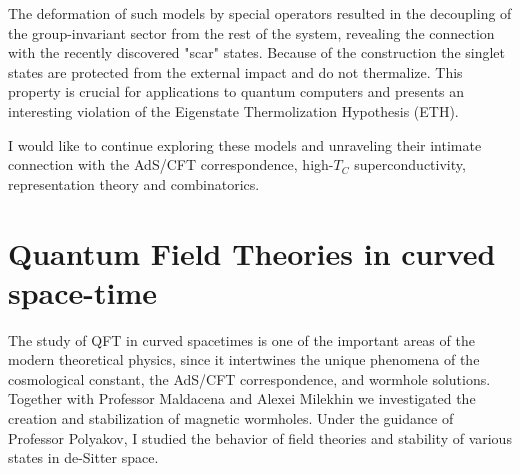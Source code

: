 \documentclass[11pt]{article}
\begin{document}
The deformation of such models by special operators resulted in the decoupling of the group-invariant sector from the rest of the system, revealing the connection with the recently discovered "scar" states. Because of the construction the singlet states are protected from the external impact and do not thermalize.
This property is crucial for applications to quantum computers and presents an interesting violation of the Eigenstate Thermolization Hypothesis (ETH).


I would like to continue exploring these models and unraveling their intimate connection with the AdS/CFT correspondence, high-$T_C$ superconductivity,
representation theory and combinatorics. %


\section*{Quantum Field Theories in curved space-time}
The study of QFT in curved spacetimes is one of the important areas of the modern theoretical physics, since it intertwines the unique phenomena of the cosmological constant, the AdS/CFT correspondence, and wormhole solutions. Together with Professor Maldacena and Alexei Milekhin we investigated the creation and stabilization of magnetic wormholes. Under the guidance of Professor Polyakov, I studied the behavior of field theories and stability of various states in de-Sitter space.


\end{document}
